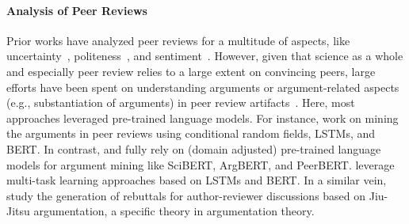 \paragraph{Analysis of Peer Reviews}
Prior 
works have analyzed peer reviews for a multitude of aspects, like uncertainty~\cite{10.1145/3529372.3533300}, politeness~\cite{politepeer}, and sentiment~\cite{Chakraborty_2020}. 
However, given that science as a whole and especially peer review relies to a large extent on convincing %
peers, large efforts have 
been spent on understanding arguments or argument-related aspects (e.g., substantiation of arguments) in peer review artifacts~\cite[e.g., ][]{Fromm2021,hua-etal-2019-argument}.
Here, most approaches leveraged pre-trained language models. For instance, \citet{hua-etal-2019-argument} work on mining the arguments in peer reviews using conditional random fields, %
LSTMs, 
and BERT. In contrast, \citet{guo-etal-2023-automatic}  and \citet{Fromm2021} fully rely on (domain adjusted) pre-trained language models for argument mining like SciBERT, ArgBERT, and PeerBERT. \citet{cheng-etal-2020-ape}  leverage multi-task learning approaches based on LSTMs and BERT. In a similar vein,  \citet{purkayastha-etal-2023-exploring} study the generation of rebuttals for author-reviewer discussions based on Jiu-Jitsu argumentation, a specific  theory in argumentation theory. 

